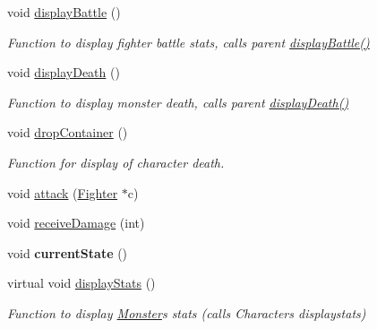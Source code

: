 \begin{DoxyCompactItemize}
\hypertarget{class_monster_a42e4c033144046eebe6cb502566423f7}{}\label{class_monster_a42e4c033144046eebe6cb502566423f7} 
void \hyperlink{class_monster_a42e4c033144046eebe6cb502566423f7}{display\+Battle} ()
\begin{DoxyCompactList}\small\item\em Function to display fighter battle stats, calls parent \hyperlink{class_monster_a42e4c033144046eebe6cb502566423f7}{display\+Battle()} \end{DoxyCompactList}\item 
\hypertarget{class_monster_a9ef924b193478c29baa90b0fa5845711}{}\label{class_monster_a9ef924b193478c29baa90b0fa5845711} 
void \hyperlink{class_monster_a9ef924b193478c29baa90b0fa5845711}{display\+Death} ()
\begin{DoxyCompactList}\small\item\em Function to display monster death, calls parent \hyperlink{class_monster_a9ef924b193478c29baa90b0fa5845711}{display\+Death()} \end{DoxyCompactList}\item 
\hypertarget{class_monster_ae86b41f41c3777be98b958c3c39b5665}{}\label{class_monster_ae86b41f41c3777be98b958c3c39b5665} 
void \hyperlink{class_monster_ae86b41f41c3777be98b958c3c39b5665}{drop\+Container} ()
\begin{DoxyCompactList}\small\item\em Function for display of character death. \end{DoxyCompactList}\item 
void \hyperlink{class_monster_ad1805087dbd4472ace66a45f053aa250}{attack} (\hyperlink{class_fighter}{Fighter} $\ast$c)
\item 
void \hyperlink{class_monster_a8a0aadbb74bed6181adb79b58d67d0a8}{receive\+Damage} (int)
\item 
\hypertarget{class_monster_a2e5fc90efefa02d77c3645f6c7768d88}{}\label{class_monster_a2e5fc90efefa02d77c3645f6c7768d88} 
void {\bfseries current\+State} ()
\item 
\hypertarget{class_monster_a7dca19cf268fa2a8602b0ccbfe1eda09}{}\label{class_monster_a7dca19cf268fa2a8602b0ccbfe1eda09} 
virtual void \hyperlink{class_monster_a7dca19cf268fa2a8602b0ccbfe1eda09}{display\+Stats} ()
\begin{DoxyCompactList}\small\item\em Function to display \hyperlink{class_monster}{Monster}\textquotesingle{}s stats (calls Character\textquotesingle{}s displaystats) \end{DoxyCompactList}\item 

\end{DoxyCompactItemize}
